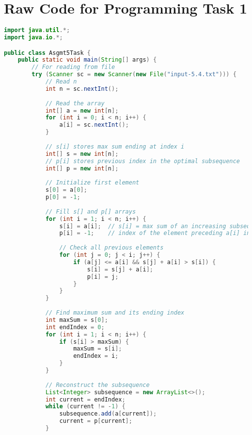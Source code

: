 \documentclass[11pt]{article}
\begin{document}
\section*{Raw Code for Programming Task 1 }
\lstset{
    basicstyle=\ttfamily\footnotesize,
    breaklines=true,  %
    frame=single,     %
    numbers=left,     %
    tabsize=4,        %
    showstringspaces=false %
}
\begin{lstlisting}[language=Java]
import java.util.*;
import java.io.*;

public class Asgmt5Task {
    public static void main(String[] args) {
        // For reading from file 
    	try (Scanner sc = new Scanner(new File("input-5.4.txt"))) {
    		// Read n
            int n = sc.nextInt();
            
            // Read the array
            int[] a = new int[n];
            for (int i = 0; i < n; i++) {
                a[i] = sc.nextInt();
            }
            
            // s[i] stores max sum ending at index i
            int[] s = new int[n];
            // p[i] stores previous index in the optimal subsequence
            int[] p = new int[n];
            
            // Initialize first element
            s[0] = a[0];
            p[0] = -1;
            
            // Fill s[] and p[] arrays
            for (int i = 1; i < n; i++) {
                s[i] = a[i];  // s[i] = max sum of an increasing subsequence with last element a[i]
                p[i] = -1;    // index of the element preceding a[i] in an increasing subsequence with max sum and last element a[i]
                
                // Check all previous elements
                for (int j = 0; j < i; j++) {
                    if (a[j] <= a[i] && s[j] + a[i] > s[i]) {
                        s[i] = s[j] + a[i];
                        p[i] = j;
                    }
                }
            }
            
            // Find maximum sum and its ending index
            int maxSum = s[0];
            int endIndex = 0;
            for (int i = 1; i < n; i++) {
                if (s[i] > maxSum) {
                    maxSum = s[i];
                    endIndex = i;
                }
            }
            
            // Reconstruct the subsequence
            List<Integer> subsequence = new ArrayList<>();
            int current = endIndex;
            while (current != -1) {
                subsequence.add(a[current]);
                current = p[current];
            }
            

\end{lstlisting}
\end{document}
